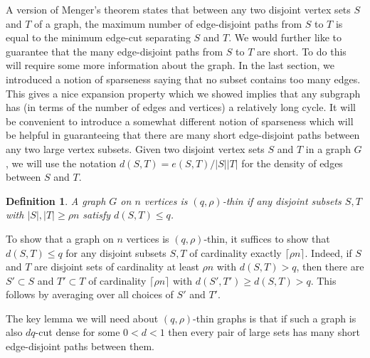 \documentclass[11pt]{article}
\newtheorem{definition}{Definition}
\begin{document}
A version of Menger's theorem \cite{M27} states that between any two disjoint vertex sets $S$ and $T$ of a graph, the maximum number of edge-disjoint paths from $S$ to $T$ is equal
to the minimum edge-cut separating $S$ and $T$. We would further like to guarantee that the many edge-disjoint paths from $S$ to $T$ are short. To do this will require some more information about the graph. In the last section, we introduced a notion of sparseness saying that no subset contains too many edges. This gives a nice expansion property which we showed implies that any subgraph has (in terms of the number of edges and vertices) a relatively long cycle. It will be convenient to introduce a somewhat different notion of sparseness which will be helpful in guaranteeing that there are many short edge-disjoint paths between any two large vertex subsets. Given two disjoint vertex sets $S$ and $T$ in a graph $G$, we will use the notation $d(S, T) = e(S, T)/|S||T|$ for the density of edges between $S$ and $T$.

\begin{definition}\label{defthin}
A graph $G$ on $n$ vertices is $(q,\rho)$-thin if any disjoint subsets $S,T$ with $|S|,|T| \geq \rho n$ satisfy $d(S,T) \leq q$.
\end{definition}

To show that a graph on $n$ vertices is $(q,\rho)$-thin, it suffices to show that $d(S,T) \leq q$ for any disjoint subsets $S,T$ of cardinality exactly $\lceil \rho n \rceil$. Indeed, if $S$ and $T$ are disjoint sets of cardinality at least $\rho n$ with $d(S,T) > q$, then there are $S' \subset S$ and $T' \subset T$ of cardinality $\lceil \rho n \rceil$ with $d(S',T') \geq d(S,T) > q$. This follows by averaging over all choices of $S'$ and $T'$.

The key lemma we will need about $(q, \rho)$-thin graphs is that if such a graph is also $dq$-cut dense for some $0 < d < 1$ then every pair of large sets has many short edge-disjoint paths between them.
\end{document}
